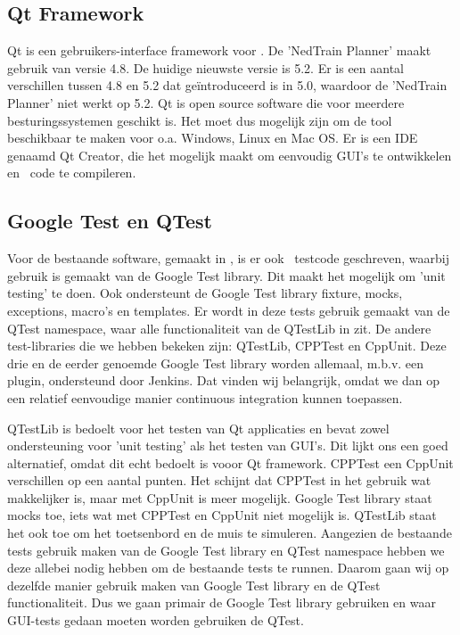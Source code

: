 \subsection{Qt Framework}
Qt is een gebruikers-interface framework voor \cpp . De 'NedTrain Planner' maakt gebruik van versie 4.8. De huidige nieuwste versie is 5.2. Er is een aantal verschillen tussen 4.8 en 5.2 dat ge\"introduceerd is in 5.0, waardoor de 'NedTrain Planner' niet werkt op 5.2. Qt is open source software die voor meerdere besturingssystemen geschikt is. Het moet dus mogelijk zijn om de tool beschikbaar te maken voor o.a. Windows, Linux en Mac OS. Er is een IDE genaamd Qt Creator, die het mogelijk maakt om eenvoudig GUI's te ontwikkelen en \cpp\ code te compileren. 

\subsection{Google Test en QTest}
Voor de bestaande software, gemaakt in \cpp, is er ook \cpp\ testcode geschreven, waarbij gebruik is gemaakt van de Google Test library. Dit maakt het mogelijk om 'unit testing' te doen. Ook ondersteunt de Google Test library fixture, mocks, exceptions, macro's en templates. Er wordt in deze tests gebruik gemaakt van de QTest namespace, waar alle functionaliteit van de QTestLib in zit. De andere test-libraries die we hebben bekeken zijn: QTestLib, CPPTest en CppUnit. Deze drie en de eerder genoemde Google Test library worden allemaal, m.b.v. een plugin, ondersteund door Jenkins. Dat vinden wij belangrijk, omdat we dan op een relatief eenvoudige manier continuous integration kunnen toepassen. 

QTestLib is bedoelt voor het testen van Qt applicaties en bevat zowel ondersteuning voor 'unit testing' als het testen van GUI's. Dit lijkt ons een goed alternatief, omdat dit echt bedoelt is vooor Qt framework. CPPTest een CppUnit verschillen op een aantal punten. Het schijnt dat CPPTest in het gebruik wat makkelijker is, maar met CppUnit is meer mogelijk. Google Test library staat mocks toe, iets wat met CPPTest en CppUnit niet mogelijk is. QTestLib staat het ook toe om het toetsenbord en de muis te simuleren. Aangezien de bestaande tests gebruik maken van de Google Test library en QTest namespace hebben we deze allebei nodig hebben om de bestaande tests te runnen. Daarom gaan wij op dezelfde manier gebruik maken van Google Test library en de QTest functionaliteit. Dus we gaan primair de Google Test library gebruiken en waar GUI-tests gedaan moeten worden gebruiken de QTest. 

